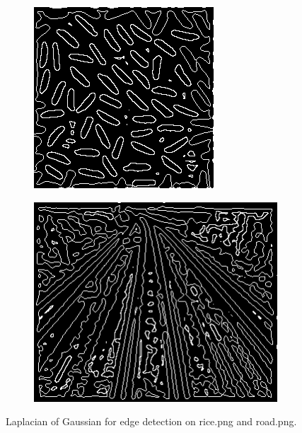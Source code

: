 \documentclass{article}
\begin{document}
\begin{figure}
        \centering
        \begin{subfigure}[b]{0.49\textwidth}
            \includegraphics[width=\textwidth]{Images/rice_log.png}
        \end{subfigure}
        \begin{subfigure}[b]{0.49\textwidth}
            \includegraphics[width=\textwidth]{Images/road_log.png}
        \end{subfigure}
        
        \caption{Laplacian of Gaussian for edge detection on \textsf{rice.png} and \textsf{road.png}.}
        \label{fig:log_r}
\end{figure}
\end{document}
